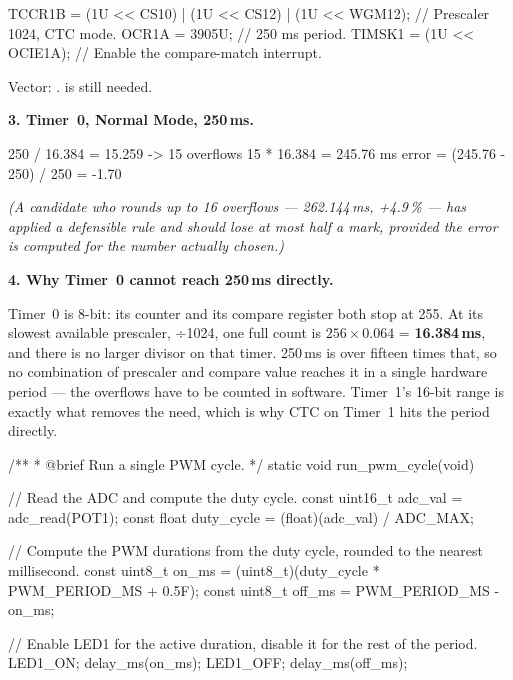 \begin{ccode}
TCCR1B = (1U << CS10) | (1U << CS12) | (1U << WGM12); // Prescaler 1024, CTC mode.
OCR1A  = 3905U;                                       // 250 ms period.
TIMSK1 = (1U << OCIE1A);                              // Enable the compare-match interrupt.
\end{ccode}

\noindent Vector: .  is still needed.

\textbf{3. Timer~0, Normal Mode, 250\,ms.} 

\begin{console}
250 / 16.384 = 15.259  ->  15 overflows
15 * 16.384 = 245.76 ms
error = (245.76 - 250) / 250 = -1.70 %
\end{console}

{\itshape (A candidate who rounds up to 16 overflows --- 262.144\,ms, +4.9\,\% --- has applied a
defensible rule and should lose at most half a mark, provided the error is computed for the number
actually chosen.)\par}

\medskip
\textbf{4. Why Timer~0 cannot reach 250\,ms directly.} 

Timer~0 is 8-bit: its counter and its compare register both stop at 255. At its slowest available
prescaler, ÷1024, one full count is $256 \times 0.064$ = \textbf{16.384\,ms}, and there is no larger
divisor on that timer. 250\,ms is over fifteen times that, so no combination of prescaler and
compare value reaches it in a single hardware period --- the overflows have to be counted in
software. Timer~1's 16-bit range is exactly what removes the need, which is why CTC on Timer~1 hits
the period directly.

\begin{ccode}
/**
 * @brief Run a single PWM cycle.
 */
static void run_pwm_cycle(void)
{
    // Read the ADC and compute the duty cycle.
    const uint16_t adc_val = adc_read(POT1);
    const float duty_cycle = (float)(adc_val) / ADC_MAX;

    // Compute the PWM durations from the duty cycle, rounded to the nearest millisecond.
    const uint8_t on_ms  = (uint8_t)(duty_cycle * PWM_PERIOD_MS + 0.5F);
    const uint8_t off_ms = PWM_PERIOD_MS - on_ms;

    // Enable LED1 for the active duration, disable it for the rest of the period.
    LED1_ON;
    delay_ms(on_ms);
    LED1_OFF;
    delay_ms(off_ms);
}
\end{ccode}

